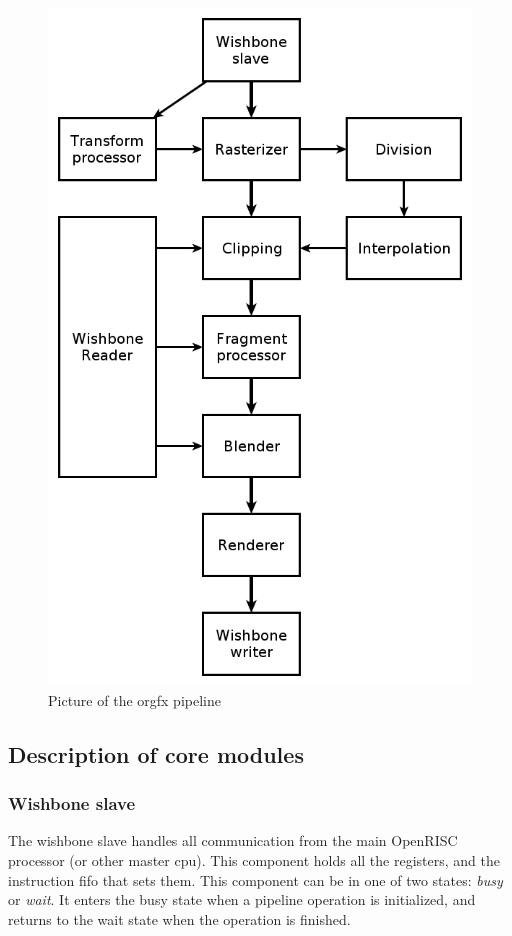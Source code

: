 \documentclass[10pt,a4paper]{article}
\begin{document}
\begin{figure}
\begin{center}
\includegraphics[scale=0.35]{../pictures/pipeline}
\caption{Picture of the orgfx pipeline}
\label{fig:pipeline}
\end{center}
\end{figure}

\subsection{Description of core modules}

\subsubsection{Wishbone slave}
The wishbone slave handles all communication from the main OpenRISC processor (or other master cpu). This component holds all the registers, and the instruction fifo that sets them. This component can be in one of two states: \textit{busy} or \textit{wait}. It enters the busy state when a pipeline operation is initialized, and returns to the wait state when the operation is finished.
\end{document}
